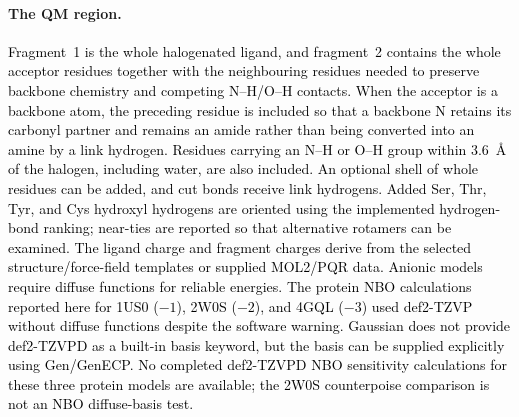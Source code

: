 \documentclass[journal=jcisd8,manuscript=article,layout=two-column]{achemso}
\newcommand{\tcb}[1]{{\textcolor{black}{#1}}}
\newcommand{\BX}{BondX Studio}
\begin{document}
\paragraph{The QM region.}
\tcb{Fragment~1 is the whole halogenated ligand, and fragment~2 contains the whole acceptor residues together with the neighbouring residues needed to preserve backbone chemistry and competing N--H/O--H contacts. When the acceptor is a backbone atom, the preceding residue is included so that a backbone N retains its carbonyl partner and remains an amide rather than being converted into an amine by a link hydrogen. Residues carrying an N--H or O--H group within 3.6~\AA{} of the halogen, including water, are also included. An optional shell of whole residues can be added, and cut bonds receive link hydrogens. Added Ser, Thr, Tyr, and Cys hydroxyl hydrogens are oriented using the implemented hydrogen-bond ranking; near-ties are reported so that alternative rotamers can be examined. The ligand charge and fragment charges derive from the selected structure/force-field templates or supplied MOL2/PQR data. Anionic models require diffuse functions for reliable energies. The protein NBO calculations reported here for 1US0 ($-1$), 2W0S ($-2$), and 4GQL ($-3$) used def2-TZVP without diffuse functions despite the software warning. Gaussian does not provide def2-TZVPD as a built-in basis keyword, but the basis can be supplied explicitly using Gen/GenECP. No completed def2-TZVPD NBO sensitivity calculations for these three protein models are available; the 2W0S counterpoise comparison is not an NBO diffuse-basis test.}
\end{document}
